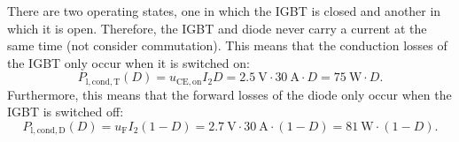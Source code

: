 \begin{solutionblock}
	There are two operating states, one in which the IGBT is closed and another in which it is open. Therefore, the IGBT and diode never carry a current at the same time (not consider commutation). This means that the conduction losses of the IGBT only occur when it is switched on:
	\begin{equation}
		P_{\mathrm{l,cond,T}}(D) = u_{\mathrm{CE,on}} I_\mathrm{2}  D = \SI {2.5}{\volt}\cdot \SI {30}{\ampere} \cdot D = \SI {75}{\watt} \cdot D .
	\end{equation}
	Furthermore, this means that the forward losses of the diode only occur when the IGBT is switched off:
	\begin{equation}
		P_{\mathrm{l,cond,D}}(D)= u_{\mathrm{F}} I_\mathrm{2} (1-D)= \SI {2.7}{\volt}\cdot \SI {30}{\ampere} \cdot (1-D) = \SI {81}{\watt} \cdot (1-D) .
	\end{equation}
\end{solutionblock}

